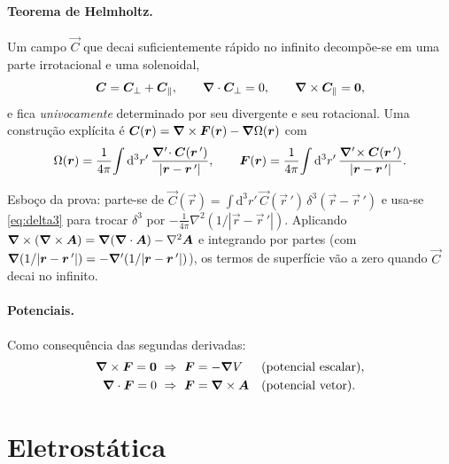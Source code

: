 \paragraph{Teorema de Helmholtz.} Um campo $\vec{C}$ que decai suficientemente
rápido no infinito decompõe-se em uma parte irrotacional e uma solenoidal,
\begin{equation}
  \bm{C}=\bm{C}_\perp+\bm{C}_\parallel,\qquad
  \bm{\nabla}\cdot\bm{C}_\perp=0,\qquad
  \bm{\nabla}\times\bm{C}_\parallel=\bm{0},
\end{equation}
e fica \emph{univocamente} determinado por seu divergente e seu rotacional. Uma
construção explícita é $\bm{C}(\bm{r})=\bm{\nabla}\times\bm{F}(\bm{r})-\bm{\nabla}\Omega(\bm{r})$
com
\begin{equation}
  \Omega(\bm{r})=\frac{1}{4\pi}\!\int \mathrm{d}^3r'\,
     \frac{\bm{\nabla}'\!\cdot\bm{C}(\bm{r}\,')}{|\bm{r}-\bm{r}\,'|},
  \qquad
  \bm{F}(\bm{r})=\frac{1}{4\pi}\!\int \mathrm{d}^3r'\,
     \frac{\bm{\nabla}'\!\times\bm{C}(\bm{r}\,')}{|\bm{r}-\bm{r}\,'|}.
\end{equation}
\begin{nota}
Esboço da prova: parte-se de
$\vec{C}(\vec{r})=\int \mathrm{d}^3r'\,\vec{C}(\vec{r}\,')\,\delta^3(\vec{r}-\vec{r}\,')$
e usa-se \eqref{eq:delta3} para trocar $\delta^3$ por
$-\tfrac{1}{4\pi}\nabla^2(1/|\vec{r}-\vec{r}\,'|)$. Aplicando
$\bm{\nabla}\times(\bm{\nabla}\times\bm{A})=\bm{\nabla}(\bm{\nabla}\cdot\bm{A})-\nabla^2\bm{A}$ e
integrando por partes (com $\bm{\nabla}(1/|\bm{r}-\bm{r}\,'|)=-\bm{\nabla}'(1/|\bm{r}-\bm{r}\,'|)$),
os termos de superfície vão a zero quando $\vec{C}$ decai no infinito.
\end{nota}

\paragraph{Potenciais.} Como consequência das segundas derivadas:
\begin{align}
  \bm{\nabla}\times\bm{F}=\bm{0}&\ \Rightarrow\ \bm{F}=-\bm{\nabla} V
  &&\text{(potencial escalar)},\\
  \bm{\nabla}\cdot\bm{F}=0&\ \Rightarrow\ \bm{F}=\bm{\nabla}\times\bm{A}
  &&\text{(potencial vetor)}.
\end{align}

\section{Eletrostática}

